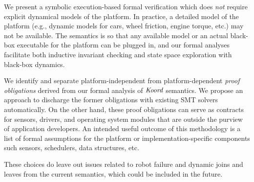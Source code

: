 \begin{noinditem}
\item We present a \K symbolic execution-based formal verification  which does {\em not} require explicit dynamical models of the platform.
In practice, a detailed model of the platform (e.g., dynamic models for cars, wheel friction, engine torque, etc.) may not be available.
The \lgname semantics is  so that any available model or an actual black-box executable for the platform can be plugged in,
and our formal analyses facilitate both inductive invariant checking and state space exploration with black-box dynamics.

\item We identify and separate platform-independent from platform-dependent \emph{proof obligations} derived from our formal analysis of $\emph{Koord}$ semantics. We  propose an approach to discharge the former obligations with existing SMT solvers automatically. 
On the other hand, these proof obligations can serve as contracts for sensors, drivers, and operating system modules that are outside the purview  of application developers.
An intended useful outcome of this methodology is a list of formal assumptions for the platform or implementation-specific components such sensors, schedulers, data structures, etc.
\end{noinditem}
%
These choices do leave out issues related to robot failure and dynamic joins and leaves from the current semantics, which could be included in the future.


